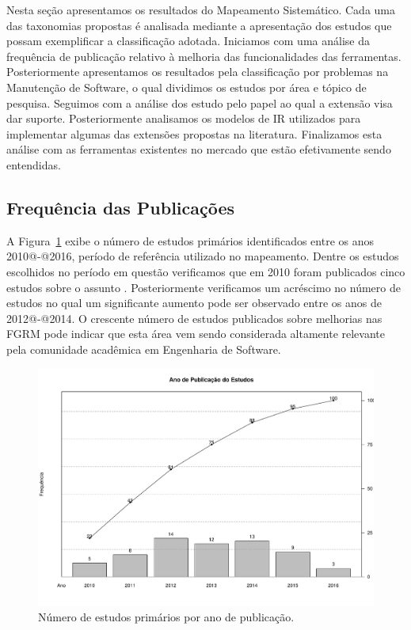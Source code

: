 Nesta seção apresentamos os resultados do Mapeamento Sistemático. Cada uma das
taxonomias propostas é analisada mediante a apresentação dos estudos que possam
exemplificar a classificação adotada.  Iniciamos com uma análise da frequência
de publicação relativo à melhoria das funcionalidades das ferramentas.
Posteriormente apresentamos os resultados pela classificação por problemas na
Manutenção de Software, o qual dividimos os estudos por área e tópico de
pesquisa. Seguimos com a análise dos estudo pelo papel ao qual a extensão visa
dar suporte. Posteriormente analisamos os modelos de IR utilizados para
implementar algumas das extensões propostas na literatura. Finalizamos esta
análise com as ferramentas existentes no mercado que estão efetivamente sendo
entendidas.

\subsection{Frequência das Publicações}
\label{sub:frequencia_publicacao}

A Figura~\ref{fig:publicacao_por_ano} exibe o número de estudos primários
identificados entre os anos 2010@-@2016, período de referência utilizado no
mapeamento. Dentre os estudos escolhidos no período em questão verificamos que
em 2010 foram publicados cinco estudos sobre o assunto
\cite{sun2010discriminative,gegick2010identifying,song2010jdf,nagwani2010predictive,zimmermann2010makes}.
Posteriormente verificamos um acréscimo no número de estudos no qual um
significante aumento pode ser observado entre os anos de 2012@-@2014. O crescente
número de estudos publicados sobre melhorias nas FGRM pode indicar que esta área
vem sendo considerada altamente relevante pela comunidade acadêmica em
Engenharia de Software.

\begin{figure}[htpb]
	\centering
	\includegraphics[width=0.9\linewidth]{chapter-mapeamento-sistematico/img/ano-publicao-estudos.pdf}
	\caption{Número de estudos primários por ano de publicação.}
\label{fig:publicacao_por_ano}
\end{figure}

